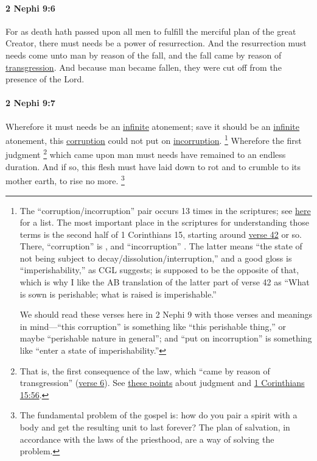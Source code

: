 		\paragraph{2 Nephi 9:6} %
			\label{2NEPHI-9-6}

			For as death hath passed upon all men
			to fulfill the merciful plan of the great Creator,
			there must needs be a power of resurrection.
			And the resurrection must needs come unto man by reason of the fall,
			and the fall came by reason of \hyperref[TRANSGRESSION-1828]{transgression}.
			And because man became fallen,
			they were cut off from the presence of the Lord.

		\paragraph{2 Nephi 9:7} %
			\label{2NEPHI-9-7}

			Wherefore it must needs be an \hyperref[INFINITE-1828]{infinite} atonement;
			save it should be an \hyperref[INFINITE-1828]{infinite} atonement,
			this \hyperref[CORRUPTION-1828]{corruption} could not put on \hyperref[INCORRUPTION]{incorruption}.%
				\footnote{%
					\label{2NEPHI-9-7-corruption}%
					The ``corruption/incorruption'' pair occurs 13 times in the scriptures; see \hyperref[CORRUPTION-PHRASES]{here} for a list. The most important place in the scriptures for understanding those terms is the second half of 1 Corinthians 15, starting around \hyperref[1CORINTHIANS-15-42]{verse 42} or so. There, ``corruption'' is \hyperref[PHTHORA]{}, and ``incorruption'' \hyperref[APHTHARSIA]{}. The latter means ``the state of not being subject to decay/dissolution/interruption,'' and a good gloss is ``imperishability,'' as CGL suggests;  is supposed to be the opposite of that, which is why I like the AB translation of the latter part of verse 42 as ``What is sown is perishable; what is raised is imperishable.'' 
					
					We should read these verses here in 2 Nephi 9 with those verses and meanings in mind---``this corruption'' is something like ``this perishable thing,'' or maybe ``perishable nature in general''; and ``put on incorruption'' is something like ``enter a state of imperishability.''
					}
			Wherefore the first judgment%
				\footnote{%
					\label{2NEPHI-9-7-judgment}%
					That is, the first consequence of the law, which ``came by reason of transgression'' (\hyperref[2NEPHI-9-6]{verse 6}). See \hyperref[JUDGE-KEYS]{these points} about judgment and \hyperref[1CORINTHIANS-15-56]{1 Corinthians 15:56}.
					}
			which came upon man
			must needs have remained to an endless duration.
			And if so, this flesh must have laid down to rot
			and to crumble to its mother earth, to rise no more.%
				\footnote{%
					\label{2NEPHI-9-7-no-more}%
					The fundamental problem of the gospel is: how do you pair a spirit with a body and get the resulting unit to last forever? The plan of salvation, in accordance with the laws of the priesthood, are a way of solving the problem.
					}

